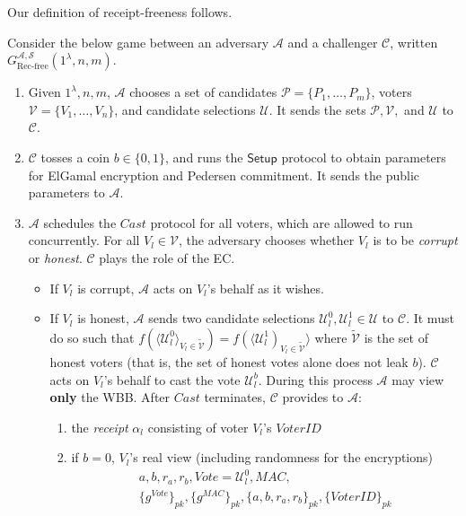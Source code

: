 \documentclass[12pt,a4paper]{article}
\theoremstyle{definition}
\newcommand{\Vote}{\mathit{Vote}}
\newcommand{\VoterID}{\mathit{VoterID}}
\newcommand{\Mac}{\mathit{MAC}}
\begin{document}
Our definition of receipt-freeness follows.
\begin{definition}
    Consider the below game between an adversary $\mathcal{A}$ and a challenger $\mathcal{C}$, written $G_{\text{Rec-free}}^{\mathcal{A},\mathcal{S}}(1^\lambda, n, m)$.
    \begin{enumerate}
        \item Given $1^\lambda, n, m$, $\mathcal{A}$ chooses a set of candidates $\mathcal{P}=\{P_1,\ldots,P_m\}$, voters $\mathcal{V}=\{V_1,\ldots,V_n\}$, and candidate selections $\mathcal{U}$. It sends the sets $\mathcal{P}, \mathcal{V},$ and $\mathcal{U}$ to $\mathcal{C}$.
        \item $\mathcal{C}$ tosses a coin $b\in\{0, 1\}$, and runs the $\mathsf{Setup}$ protocol to obtain parameters for ElGamal encryption and Pedersen commitment. It sends the public parameters to $\mathcal{A}$.
        \item $\mathcal{A}$ schedules the $\mathit{Cast}$ protocol for all voters, which are allowed to run concurrently. For all $V_l\in\mathcal{V}$, the adversary chooses whether $V_l$ is to be \textit{corrupt} or \textit{honest}. $\mathcal{C}$ plays the role of the EC.
        \begin{itemize}
            \item If $V_l$ is corrupt, $\mathcal{A}$ acts on $V_l$'s behalf as it wishes.
            \item If $V_l$ is honest, $\mathcal{A}$ sends two candidate selections $\mathcal{U}_l^0, \mathcal{U}_l^1 \in \mathcal{U}$ to $\mathcal{C}$. It must do so such that $f(\langle\mathcal{U}_l^0\rangle_{V_l\in \tilde{\mathcal{V}}})=f(\langle\mathcal{U}^1_l)_{V_l\in \tilde{\mathcal{V}}}\rangle$ where $\tilde{\mathcal{V}}$ is the set of honest voters (that is, the set of honest votes alone does not leak $b$). $\mathcal{C}$ acts on $V_l$'s behalf to cast the vote $\mathcal{U}_l^b$. During this process $\mathcal{A}$ may view \textbf{only} the WBB. After $\mathit{Cast}$ terminates, $\mathcal{C}$ provides to $\mathcal{A}$:
            \begin{enumerate}
                \item the \textit{receipt} $\alpha_l$ consisting of voter $V_l$'s $\VoterID$
                \item if $b=0$, $V_l$'s real view (including randomness for the encryptions)
                \begin{gather*}
                    a, b, r_a, r_b, \Vote=\mathcal{U}^0_l, \Mac,\\\{g^\Vote\}_{pk}, \{g^\Mac\}_{pk}, \{a,b,r_a,r_b\}_{pk},\{\VoterID\}_{pk}

\end{gather*}
\end{enumerate}
\end{itemize}
\end{enumerate}
\end{definition}
\end{document}
